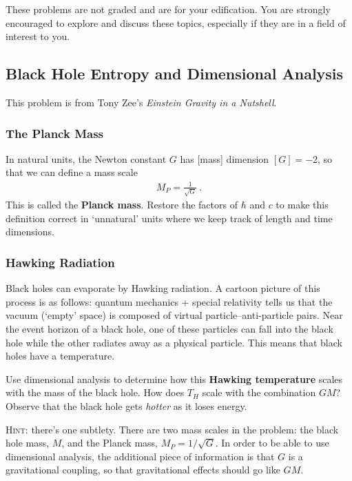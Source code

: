 \documentclass[12pt]{article}
\numberwithin{equation}{subsection}    %
\begin{document}
These problems are not graded and are for your edification. You are strongly encouraged to explore and discuss these topics, especially if they are in a field of interest to you.









\subsection{Black Hole Entropy and Dimensional Analysis}

This problem is from Tony Zee's \emph{Einstein Gravity in a Nutshell}. 

\subsubsection{The Planck Mass}

In natural units, the Newton constant $G$ has [mass] dimension $[G] = -2$, so that we can define a mass scale
\begin{align}
	M_P = \frac{1}{\sqrt{G}} \ .
\end{align}
This is called the \textbf{Planck mass}. Restore the factors of $\hbar$ and $c$ to make this definition correct in `unnatural' units where we keep track of length and time dimensions.

\subsubsection{Hawking Radiation}

Black holes can evaporate by Hawking radiation. A cartoon picture of this process is as follows: quantum mechanics + special relativity tells us that the vacuum (`empty' space) is composed of virtual particle--anti-particle pairs. Near the event horizon of a black hole, one of these particles can fall into the black hole while the other radiates away as a physical particle. This means that black holes have a temperature. 

Use dimensional analysis to determine how this \textbf{Hawking temperature} scales with the mass of the black hole. How does $T_H$ scale with the combination $GM$? Observe that the black hole gets \emph{hotter} as it loses energy.


\textsc{Hint}: there's one subtlety. There are two mass scales in the problem: the black hole mass, $M$, and the Planck mass, $M_P = 1/\sqrt{G}$. In order to be able to use dimensional analysis, the additional piece of information is that $G$ is a gravitational coupling, so that gravitational effects should go like $GM$. 
\end{document}
